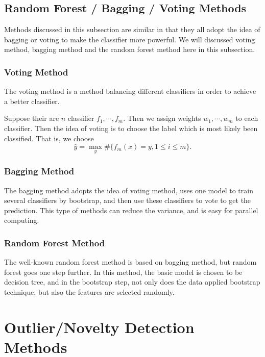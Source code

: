 \documentclass[english]{article}
\begin{document}
\subsection{Random Forest / Bagging / Voting Methods}
\par Methods discussed in this subsection are similar in that they all adopt the idea of bagging or voting to make the classifier more powerful. We will discussed voting method, bagging method and the random forest method here in this subsection.

\subsubsection{Voting Method}
\par The voting method is a method balancing different classifiers in order to achieve a better classifier.
\par Suppose their are $n$ classifier $f_{1}, \cdots, f_{m}$. Then we assign weights $w_{1}, \cdots, w_{m}$ to each classifier. Then the idea of voting is to choose the label which is most likely been classified. That is, we choose 
\begin{equation}
	\hat{y} = \max_{y}\#\{f_{m}(x) = y, 1\le i\le m\}.
\end{equation}

\subsubsection{Bagging Method}
\par The bagging method adopts the idea of voting method, uses one model to train several classifiers by bootstrap, and then use these classifiers to vote to get the prediction. This type of methods can reduce the variance, and is easy for parallel computing.

\subsubsection{Random Forest Method}
\par The well-known random forest method is based on bagging method, but random forest goes one step further. In this method, the basic model is chosen to be decision tree, and in the bootstrap step, not only does the data applied bootstrap technique, but also the features are selected randomly.

\section{Outlier/Novelty Detection Methods}
\end{document}
